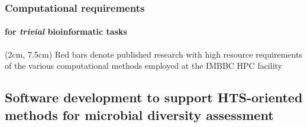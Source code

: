 \documentclass{beamer}
\begin{document}
   \begin{frame}

      \frametitle{Computational requirements}
      \framesubtitle{for \textit{trivial} bioinformatic tasks}


      \begin{textblock*}{10cm}(2cm, 7.5cm)
            \scriptsize Red bars denote published research with high resource requirements \\
            \scriptsize of the various computational methods employed at the IMBBC HPC facility
      \end{textblock*}
   \end{frame}




   \begin{darkframes}
      \section{
      Software development to support HTS-oriented methods for microbial diversity assessment
      }
   \end{darkframes}
\end{document}
